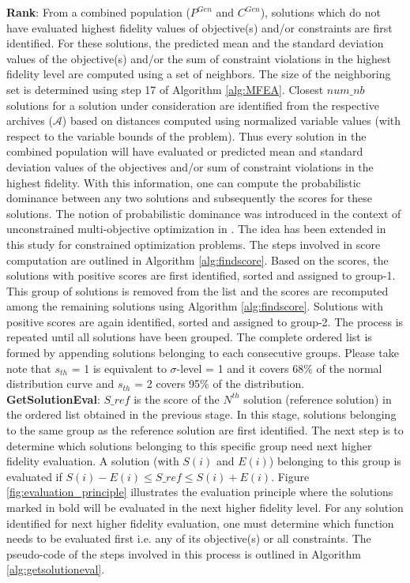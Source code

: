 \noindent\textbf{Rank}: From a combined population ($P^{Gen}$ and $C^{Gen}$), solutions which do not have evaluated highest fidelity values of objective(s) and/or constraints are first identified. For these solutions, the predicted mean and the standard deviation values of the objective(s) and/or the sum of constraint violations in the highest fidelity level are computed using a set of neighbors. The size of the neighboring set is determined using step 17 of Algorithm \ref{alg:MFEA}. Closest $num\_nb$ solutions for a solution under consideration are identified from the respective archives ($\mathcal{A}$) based on distances computed using normalized variable values (with respect to the variable bounds of the problem). Thus every solution in the combined population will have evaluated or predicted mean and standard deviation values of the objectives and/or sum of constraint violations in the highest fidelity. With this information, one can compute the probabilistic dominance between any two solutions and subsequently the scores for these solutions. The notion of probabilistic dominance was introduced in the context of unconstrained multi-objective optimization in \cite{Hughes2001un}. The idea has been extended in this study for constrained optimization problems. The steps involved in score computation are outlined in Algorithm \ref{alg:findscore}. Based on the scores, the solutions with positive scores are first identified, sorted and assigned to group-1. This group of solutions is removed from the list and the scores are recomputed among the remaining solutions using Algorithm \ref{alg:findscore}. Solutions with positive scores are again identified, sorted and assigned to group-2. The process is repeated until all solutions have been grouped. The complete ordered list is formed by appending solutions belonging to each consecutive groups. Please take note that $s_{th}$ = 1 is equivalent to $\sigma$-level = 1 and it covers 68\% of the normal distribution curve and $s_{th}$ = 2 covers 95\% of the distribution. \\

\noindent\textbf{GetSolutionEval}: $S\_ref$ is the score of the $N^{th}$ solution (reference solution) in the ordered list obtained in the previous stage. In this stage, solutions belonging to the same group as the reference solution are first identified. The next step is to determine which solutions belonging to this specific group need next higher fidelity evaluation. A solution (with $S(i)$ and $E(i)$) belonging to this group is evaluated if $S (i) - E (i) \le S\_ref \le S (i) + E (i)$. Figure \ref{fig:evaluation_principle} illustrates the evaluation principle where the solutions marked in bold will be evaluated in the next higher fidelity level. For any solution identified for next higher fidelity evaluation, one must determine which function needs to be evaluated first i.e. any of its objective(s) or all constraints. The pseudo-code of the steps involved in this process is outlined in Algorithm \ref{alg:getsolutioneval}.


